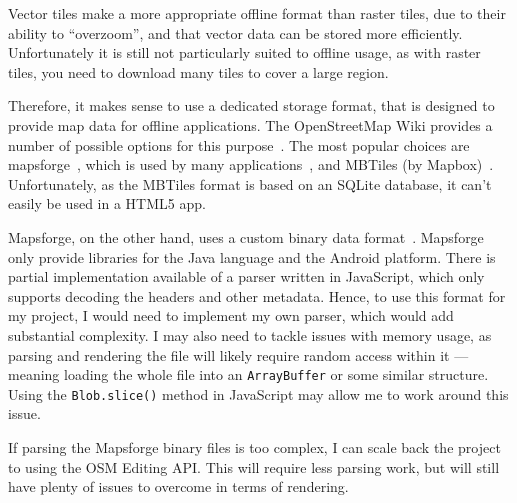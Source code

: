 Vector tiles make a more appropriate offline format than raster tiles, due to their ability to ``overzoom'', and that vector data can be stored more efficiently. Unfortunately it is still not particularly suited to offline usage, as with raster tiles, you need to download many tiles to cover a large region.

Therefore, it makes sense to use a dedicated storage format, that is designed to provide map data for offline applications. The OpenStreetMap Wiki provides a number of possible options for this purpose~\cite{osm-wiki-offline}. The most popular choices are mapsforge~\cite{mapsforge}, which is used by many applications~\cite{apps-using-mapsforge}, and MBTiles (by Mapbox)~\cite{mapbox-mbtiles}. Unfortunately, as the MBTiles format is based on an SQLite database, it can't easily be used in a HTML5 app.

Mapsforge, on the other hand, uses a custom binary data format~\cite{mapsforge-format}. Mapsforge only provide libraries for the Java language and the Android platform. There is partial implementation available of a parser written in JavaScript, which only supports decoding the headers and other metadata. Hence, to use this format for my project, I would need to implement my own parser, which would add substantial complexity. I may also need to tackle issues with memory usage, as parsing and rendering the file will likely require random access within it --- meaning loading the whole file into an \texttt{ArrayBuffer} or some similar structure. Using the \texttt{Blob.slice()} method in JavaScript may allow me to work around this issue.

If parsing the Mapsforge binary files is too complex, I can scale back the project to using the OSM Editing API\@. This will require less parsing work, but will still have plenty of issues to overcome in terms of rendering.

